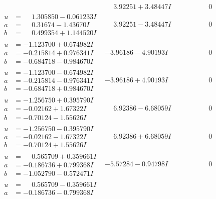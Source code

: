 \documentclass[1p]{elsarticle_modified}
\theoremstyle{definition}
\begin{document}
$$\begin{array}{c|c|c}
 & \phantom{-}3.92251 + 3.48447 I & \phantom{-0.000000 } 0 \\ \hline\begin{aligned}
u &= \phantom{-}1.305850 - 0.061233 I \\
a &= \phantom{-}0.31674 - 1.43670 I \\
b &= \phantom{-}0.499354 + 1.144520 I\end{aligned}
 & \phantom{-}3.92251 - 3.48447 I & \phantom{-0.000000 } 0 \\ \hline\begin{aligned}
u &= -1.123700 + 0.674982 I \\
a &= -0.215814 + 0.976341 I \\
b &= -0.684718 - 0.984670 I\end{aligned}
 & -3.96186 - 4.90193 I & \phantom{-0.000000 } 0 \\ \hline\begin{aligned}
u &= -1.123700 - 0.674982 I \\
a &= -0.215814 - 0.976341 I \\
b &= -0.684718 + 0.984670 I\end{aligned}
 & -3.96186 + 4.90193 I & \phantom{-0.000000 } 0 \\ \hline\begin{aligned}
u &= -1.256750 + 0.395790 I \\
a &= -0.02162 + 1.67322 I \\
b &= -0.70124 - 1.55626 I\end{aligned}
 & \phantom{-}6.92386 - 6.68059 I & \phantom{-0.000000 } 0 \\ \hline\begin{aligned}
u &= -1.256750 - 0.395790 I \\
a &= -0.02162 - 1.67322 I \\
b &= -0.70124 + 1.55626 I\end{aligned}
 & \phantom{-}6.92386 + 6.68059 I & \phantom{-0.000000 } 0 \\ \hline\begin{aligned}
u &= \phantom{-}0.565709 + 0.359661 I \\
a &= -0.186736 + 0.799368 I \\
b &= -1.052790 - 0.572471 I\end{aligned}
 & -5.57284 - 0.94798 I & \phantom{-0.000000 } 0 \\ \hline\begin{aligned}
u &= \phantom{-}0.565709 - 0.359661 I \\
a &= -0.186736 - 0.799368 I \\

\end{aligned}
\end{array}$$
\end{document}
